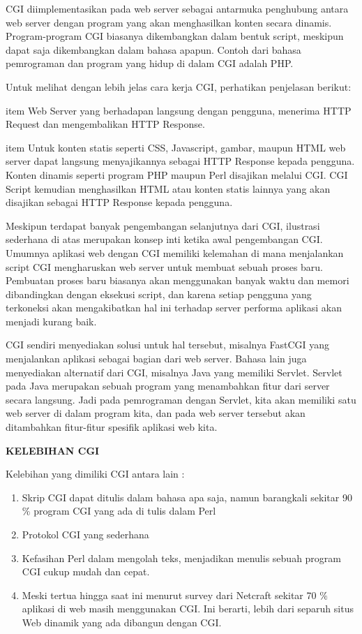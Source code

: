 	\vspace{12pt}
	CGI diimplementasikan pada web server sebagai antarmuka penghubung antara web server dengan program yang akan menghasilkan konten secara dinamis. Program-program CGI biasanya dikembangkan dalam bentuk script, meskipun dapat saja dikembangkan dalam bahasa apapun. Contoh dari bahasa pemrograman dan program yang hidup di dalam CGI adalah PHP. \par
	\noindent 
	Untuk melihat dengan lebih jelas cara kerja CGI, perhatikan penjelasan berikut: \par
	\noindent 
\hspace*{0,5in}item Web Server yang berhadapan langsung dengan pengguna, menerima HTTP Request dan mengembalikan HTTP Response. \par
		\noindent 
item Untuk konten statis seperti CSS, Javascript, gambar, maupun HTML web server dapat langsung menyajikannya sebagai HTTP Response kepada pengguna. Konten dinamis seperti program PHP maupun Perl disajikan melalui CGI. CGI Script kemudian menghasilkan HTML atau konten statis lainnya yang akan disajikan sebagai HTTP Response kepada pengguna.
	\par
	\vspace{12pt}
Meskipun terdapat banyak pengembangan selanjutnya dari CGI, ilustrasi sederhana di atas merupakan konsep inti ketika awal pengembangan CGI. Umumnya aplikasi web dengan CGI memiliki kelemahan di mana menjalankan script CGI mengharuskan web server untuk membuat sebuah proses baru. Pembuatan proses baru biasanya akan menggunakan banyak waktu dan memori dibandingkan dengan eksekusi script, dan karena setiap pengguna yang terkoneksi akan mengakibatkan hal ini terhadap server performa aplikasi akan menjadi kurang baik. \par
CGI sendiri menyediakan solusi untuk hal tersebut, misalnya FastCGI yang menjalankan aplikasi sebagai bagian dari web server. Bahasa lain juga menyediakan alternatif dari CGI, misalnya Java yang memiliki Servlet. Servlet pada Java merupakan sebuah program yang menambahkan fitur dari server secara langsung. Jadi pada pemrograman dengan Servlet, kita akan memiliki satu web server di dalam program kita, dan pada web server tersebut akan ditambahkan fitur-fitur spesifik aplikasi web kita. \par
	\vspace{12pt}
\textbf{KELEBIHAN CGI} \par
\noindent 
Kelebihan yang dimiliki CGI antara lain :  \par
\noindent 
\begin{enumerate}
	\item Skrip CGI dapat ditulis dalam bahasa apa saja, namun barangkali sekitar 90 $  \%  $ program CGI yang ada di tulis dalam Perl 
	\item Protokol CGI yang sederhana
	\item Kefasihan Perl dalam mengolah teks, menjadikan menulis sebuah program CGI cukup mudah dan cepat.
	\item Meski tertua hingga saat ini menurut survey dari Netcraft sekitar 70 $  \%  $ aplikasi di web masih menggunakan CGI. Ini berarti, lebih dari separuh situs Web dinamik yang ada dibangun dengan CGI.\end{enumerate}
